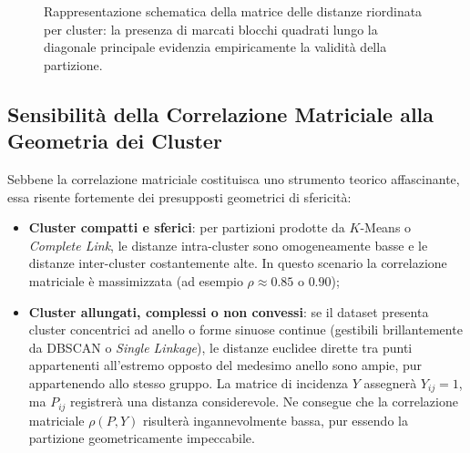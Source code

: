 \begin{figure}[H]
{%
}
\caption{Rappresentazione schematica della matrice delle distanze riordinata per cluster: la presenza di marcati blocchi quadrati lungo la diagonale principale evidenzia empiricamente la validità della partizione.}
\label{fig:dm-reordered-matrix-schema}
\end{figure}

\FloatBarrier
\subsection{Sensibilità della Correlazione Matriciale alla Geometria dei Cluster}
Sebbene la correlazione matriciale costituisca uno strumento teorico affascinante, essa risente fortemente dei presupposti geometrici di sfericità:
\begin{itemize}
    \item \textbf{Cluster compatti e sferici}: per partizioni prodotte da $K$-Means o \textit{Complete Link}, le distanze intra-cluster sono omogeneamente basse e le distanze inter-cluster costantemente alte. In questo scenario la correlazione matriciale è massimizzata (ad esempio $\rho \approx 0.85$ o $0.90$);
    \item \textbf{Cluster allungati, complessi o non convessi}: se il dataset presenta cluster concentrici ad anello o forme sinuose continue (gestibili brillantemente da DBSCAN o \textit{Single Linkage}), le distanze euclidee dirette tra punti appartenenti all'estremo opposto del medesimo anello sono ampie, pur appartenendo allo stesso gruppo. La matrice di incidenza $Y$ assegnerà $Y_{ij} = 1$, ma $P_{ij}$ registrerà una distanza considerevole. Ne consegue che la correlazione matriciale $\rho(P, Y)$ risulterà ingannevolmente bassa, pur essendo la partizione geometricamente impeccabile.
\end{itemize}

